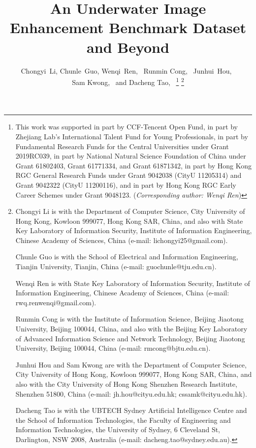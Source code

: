 \documentclass[journal]{IEEEtran}
\begin{document}
\title{An Underwater Image Enhancement Benchmark Dataset and Beyond}
\author{Chongyi~Li,
        Chunle~Guo,
        Wenqi~Ren,~
        Runmin Cong,~
        Junhui~Hou,~ \\
        Sam Kwong,~
        and Dacheng Tao,~
\thanks{This work was supported in part by CCF-Tencent Open Fund, in part by Zhejiang Lab's International Talent Fund for Young Professionals, in part by Fundamental Research Funds for the Central Universities under Grant 2019RC039, in part by National Natural Science Foundation of China under Grant 61802403, Grant 61771334, and Grant 61871342,  in part by Hong Kong RGC General Research Funds under Grant 9042038 (CityU 11205314) and Grant 9042322 (CityU 11200116), and in part by Hong Kong RGC Early Career Schemes under Grant 9048123. (\emph{Corresponding author: Wenqi Ren})}
\thanks{Chongyi Li is with the Department of Computer Science, City University of Hong Kong, Kowloon 999077, Hong Kong SAR, China, and also with State Key Laboratory of Information Security, Institute of Information Engineering, Chinese Academy of Sciences, China  (e-mail: lichongyi25@gmail.com).

Chunle Guo is with the School of Electrical and Information Engineering, Tianjin University, Tianjin, China (e-mail: guochunle@tju.edu.cn).

Wenqi Ren is with State Key Laboratory of Information Security, Institute of Information Engineering, Chinese Academy of Sciences, China (e-mail: rwq.renwenqi@gmail.com).

Runmin Cong is with the Institute of Information Science, Beijing Jiaotong University, Beijing 100044, China, and also with the Beijing Key Laboratory of Advanced Information Science and Network Technology, Beijing Jiaotong University, Beijing 100044, China (e-mail: rmcong@bjtu.edu.cn).

Junhui Hou and Sam Kwong are with the Department of Computer Science, City University of Hong Kong, Kowloon 999077, Hong Kong SAR, China, and also with the City University of Hong Kong Shenzhen Research Institute, Shenzhen 51800, China (e-mail: jh.hou@cityu.edu.hk; cssamk@cityu.edu.hk).

Dacheng Tao is with the UBTECH Sydney Artificial Intelligence Centre and the School of Information Technologies, the Faculty of Engineering
and Information Technologies, the University of Sydney, 6 Cleveland St, Darlington, NSW 2008, Australia (e-mail: dacheng.tao@sydney.edu.au).
}}
\end{document}
